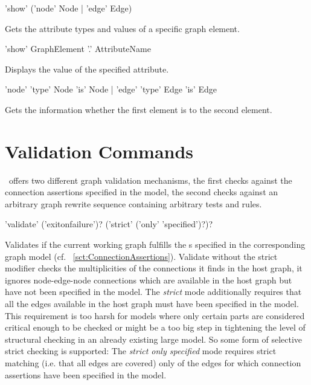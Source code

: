 \begin{rail}
 'show' ('node' Node | 'edge' Edge)
\end{rail}
Gets the attribute types and values of a specific graph element.

\begin{rail}
  'show' GraphElement '.' AttributeName
\end{rail}
Displays the value of the specified attribute.

\begin{rail}
  'node' 'type' Node 'is' Node | 'edge' 'type' Edge 'is' Edge
\end{rail}
Gets the information whether the first element is  to the second element.


\section{Validation Commands}\label{sec:validate}

\GrG\ offers two different graph validation mechanisms,
the first checks against the connection assertions specified in the model,
the second checks against an arbitrary graph rewrite sequence containing arbitrary tests and rules.

\begin{rail}
  'validate' ('exitonfailure')? ('strict' ('only' 'specified')?)?
\end{rail}
Validates if the current working graph fulfills the s specified in the corresponding graph model (cf. ~\ref{sct:ConnectionAssertions}).
Validate without the strict modifier checks the multiplicities of the connections it finds in the host graph,
it ignores node-edge-node connections which are available in the host graph but have not been specified in the model.
The \emph{strict} mode additionally requires that all the edges available in the host graph must have been specified in the model.
This requirement is too harsh for models where only certain parts are considered critical enough to be checked
or might be a too big step in tightening the level of structural checking in an already existing large model.
So some form of selective strict checking is supported:
The \emph{strict only specified} mode requires strict matching (i.e. that all edges are covered) only of the edges for which connection assertions have been specified in the model.

